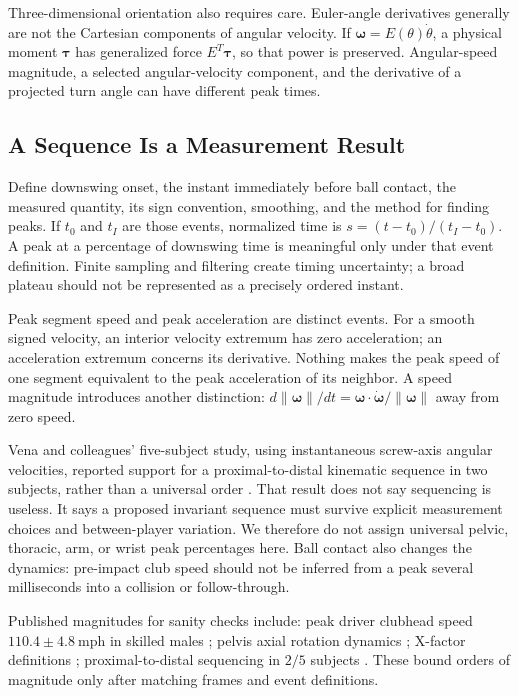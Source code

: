 Three-dimensional orientation also requires care. Euler-angle derivatives generally are not the Cartesian components of angular velocity. If $\boldsymbol\omega=E(\theta)\dot\theta$, a physical moment $\boldsymbol\tau$ has generalized force $E^T\boldsymbol\tau$, so that power is preserved. Angular-speed magnitude, a selected angular-velocity component, and the derivative of a projected turn angle can have different peak times.

\subsection{A Sequence Is a Measurement Result}
Define downswing onset, the instant immediately before ball contact, the measured quantity, its sign convention, smoothing, and the method for finding peaks. If $t_0$ and $t_I$ are those events, normalized time is $s=(t-t_0)/(t_I-t_0)$. A peak at a percentage of downswing time is meaningful only under that event definition. Finite sampling and filtering create timing uncertainty; a broad plateau should not be represented as a precisely ordered instant.

Peak segment speed and peak acceleration are distinct events. For a smooth signed velocity, an interior velocity extremum has zero acceleration; an acceleration extremum concerns its derivative. Nothing makes the peak speed of one segment equivalent to the peak acceleration of its neighbor. A speed magnitude introduces another distinction: $d\|\boldsymbol\omega\|/dt=\boldsymbol\omega\cdot\dot{\boldsymbol\omega}/\|\boldsymbol\omega\|$ away from zero speed.

Vena and colleagues' five-subject study, using instantaneous screw-axis angular velocities, reported support for a proximal-to-distal kinematic sequence in two subjects, rather than a universal order \citep{vena2011kinematic}. That result does not say sequencing is useless. It says a proposed invariant sequence must survive explicit measurement choices and between-player variation. We therefore do not assign universal pelvic, thoracic, arm, or wrist peak percentages here. Ball contact also changes the dynamics: pre-impact club speed should not be inferred from a peak several milliseconds into a collision or follow-through.

Published magnitudes for sanity checks include: peak driver clubhead speed $110.4\pm4.8\ \mathrm{mph}$ in skilled males \citep{han2019}; pelvis axial rotation dynamics \citep{Takagi2021pelvis}; X-factor definitions \citep{Cheetham2001}; proximal-to-distal sequencing in $2/5$ subjects \citep{vena2011kinematic}. These bound orders of magnitude only after matching frames and event definitions.

